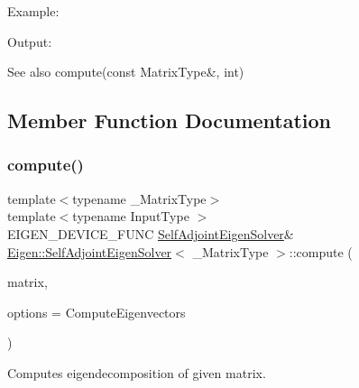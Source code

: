 Example\+: 
\begin{DoxyCodeInclude}{0}
\end{DoxyCodeInclude}
 Output\+: 
\begin{DoxyVerbInclude}
\end{DoxyVerbInclude}


\begin{DoxySeeAlso}{See also}
compute(const Matrix\+Type\&, int) 
\end{DoxySeeAlso}


\subsection{Member Function Documentation}
\mbox{\label{class_eigen_1_1_self_adjoint_eigen_solver_a88bcdc24112efa7c4d2ebb3476efcbe9}} 
\subsubsection{\texorpdfstring{compute()}{compute()}}
{\footnotesize\ttfamily template$<$typename \+\_\+\+Matrix\+Type$>$ \\
template$<$typename Input\+Type $>$ \\
E\+I\+G\+E\+N\+\_\+\+D\+E\+V\+I\+C\+E\+\_\+\+F\+U\+NC \mbox{\hyperlink{class_eigen_1_1_self_adjoint_eigen_solver}{Self\+Adjoint\+Eigen\+Solver}}\& \mbox{\hyperlink{class_eigen_1_1_self_adjoint_eigen_solver}{Eigen\+::\+Self\+Adjoint\+Eigen\+Solver}}$<$ \+\_\+\+Matrix\+Type $>$\+::compute (\begin{DoxyParamCaption}\item[{const \mbox{\hyperlink{struct_eigen_1_1_eigen_base}{Eigen\+Base}}$<$ Input\+Type $>$ \&}]{matrix,  }\item[{int}]{options = {\ttfamily ComputeEigenvectors} }\end{DoxyParamCaption})}



Computes eigendecomposition of given matrix. 


